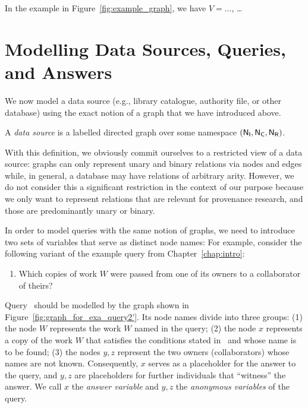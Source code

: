 In the example in Figure~\ref{fig:example_graph},
we have $V = \dots$, \dots{}

\section{Modelling Data Sources, Queries, and Answers}

We now model a data source (e.g., library catalogue, authority file, or other database)
using the exact notion of a graph that we have introduced above.
%
\begin{definition}
  A \emph{data source} is a labelled directed graph
  over some namespace $(\mathsf{N}_\mathsf{I},\mathsf{N}_\mathsf{C},\mathsf{N}_\mathsf{R})$.
\end{definition}
%
With this definition, we obviously commit ourselves to a restricted view of a data source:
graphs can only represent unary and binary relations via nodes and edges
while, in general, a database may have relations of arbitrary arity.
However, we do not consider this a significant restriction in the context of our purpose
because we only want to represent relations that are relevant for provenance research,
and those are predominantly unary or binary. 

In order to model queries with the same notion of graphs, we need to introduce
two sets of variables that serve as distinct node names:
For example, consider the following variant of the example query  from Chapter~\ref{chap:intro}:
%
\begin{enumerate}
  \item[\exaquery{2$'$}]
    Which copies of work $W$ were passed from one of its owners to a collaborator of theirs?
\end{enumerate}
%
Query~
should be modelled by the graph shown in Figure~\ref{fig:graph_for_exa_query2'}.
Its node names divide into three groups:
(1) the node $W$ represents the work $W$ named in the query;
(2) the node $x$ represents a copy of the work $W$ that satisfies the conditions stated in~ and
whose name is to be found;
(3) the nodes $y,z$ represent the two owners (collaborators) whose names are not known.
Consequently, $x$ serves as a placeholder for the answer to the query,
and $y,z$ are placeholders for further individuals that ``witness'' the answer.
We call $x$ the \emph{answer variable} and $y,z$ the \emph{anonymous variables}
of the query.

